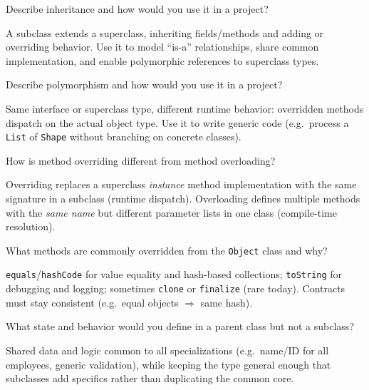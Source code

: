 \newpage


\question[4]
Describe inheritance and how would you use it in a project?
\begin{solutionorbox}[1.55in]
  A subclass extends a superclass, inheriting fields/methods and adding or overriding behavior. Use it to model ``is-a'' relationships, share common implementation, and enable polymorphic references to superclass types.
\end{solutionorbox}

\question[4]
Describe polymorphism and how would you use it in a project?
\begin{solutionorbox}[1.5in]
  Same interface or superclass type, different runtime behavior: overridden methods dispatch on the actual object type. Use it to write generic code (e.g.\ process a \texttt{List} of \texttt{Shape} without branching on concrete classes).
\end{solutionorbox}

\question[4]
How is method overriding different from method overloading?
\begin{solutionorbox}[1.25in]
  Overriding replaces a superclass \emph{instance} method implementation with the same signature in a subclass (runtime dispatch). Overloading defines multiple methods with the \emph{same name} but different parameter lists in one class (compile-time resolution).
\end{solutionorbox}

\question[4]
What methods are commonly overridden from the \texttt{Object} class and why?
\begin{solutionorbox}[1.45in]
  \texttt{equals}/\texttt{hashCode} for value equality and hash-based collections; \texttt{toString} for debugging and logging; sometimes \texttt{clone} or \texttt{finalize} (rare today). Contracts must stay consistent (e.g.\ equal objects \(\Rightarrow\) same hash).
\end{solutionorbox}

\newpage


\question[4]
What state and behavior would you define in a parent class but not a subclass?
\begin{solutionorbox}[1.45in]
  Shared data and logic common to all specializations (e.g.\ name/ID for all employees, generic validation), while keeping the type general enough that subclasses add specifics rather than duplicating the common core.
\end{solutionorbox}

